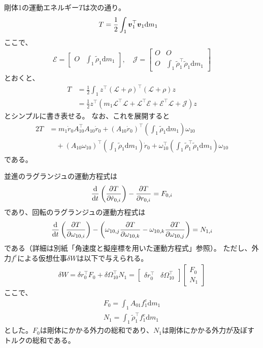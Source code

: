 \documentclass[a4j,10pt]{jsarticle}
\def\vctr#1{\mbox{\boldmath $#1$}}
\newcommand{\bbn}[2]{\dfrac{{\rm {\rm d}} #1}{{\rm {\rm d}} #2}}
\newcommand{\henbbn}[2]{\dfrac{\partial #1}{\partial #2}}
\newcommand{\zenbbn}[1]{\mathrm{d} #1}
\begin{document}
剛体1の運動エネルギー$T$は次の通り。
\begin{align}
    T &= \frac{1}{2}\int_1 \vctr{v}_1^\top \vctr{v}_1 \zenbbn{m_1}
\end{align}
ここで、
\begin{align*}
    \mathcal{E} = \begin{bmatrix}
        O & \int_1 \tilde{\rho}_1 \zenbbn{m_1}
    \end{bmatrix},
    \quad
    \mathcal{J} = \begin{bmatrix}
        O & O\\
        O & \int_1 \tilde{\rho}_1^\top \tilde{\rho}_1\zenbbn{m_1}
    \end{bmatrix}
\end{align*}
とおくと、
\begin{align}
    T &=\frac{1}{2}\int_1 z^\top (\mathcal{L} + \mathcal{\rho})^\top(\mathcal{L}+\mathcal{\rho})z\nonumber\\
    &= \frac{1}{2}z^\top\left( m_1 \mathcal{L}^\top \mathcal{L} + \mathcal{L}^\top \mathcal{E} + \mathcal{E}^\top \mathcal{L} + \mathcal{J} \right)z
\end{align}
とシンプルに書き表せる。
なお、これを展開すると
\begin{align*}
    2T &= m_1\dot{r}_0A_{10}^\top A_{10}\dot{r}_0
    + (A_{10}\dot{r}_0)^\top \left(\int_1 \tilde{\rho}_1 \zenbbn{m_1}\right)\omega_{10}\\
    &\quad+ (A_{10}\omega_{10})^\top \left(\int_1 \tilde{\rho}_1 \zenbbn{m_1}\right)\dot{r}_0
    + \omega_{10}^\top \left(\int_1 \tilde{\rho}_1^\top \tilde{\rho}_1\zenbbn{m_1}\right) \omega_{10}
\end{align*}
である。

並進のラグランジュの運動方程式は
\begin{align}
    \bbn{}{t}\left( \henbbn{T}{\dot{r}_{0,i}} \right) - \henbbn{T}{r_{0,i}} = F_{0,i}
\end{align}
であり、回転のラグランジュの運動方程式は
\begin{align}
    \bbn{}{t}\left( \henbbn{T}{\omega_{10,i}} \right) - \left( \omega_{10,j}\henbbn{T}{\omega_{10,k}} - \omega_{10,k}\henbbn{T}{\omega_{10,j}} \right) = N_{1,i}
\end{align}
である（詳細は別紙「角速度と擬座標を用いた運動方程式」参照）。
ただし、外力$f^{e}$による仮想仕事$\delta W$は以下で与えられる。
\begin{align}
    \delta W = \delta r_0^\top F_0 + \delta \Omega_{10}^\top N_1
    =\begin{bmatrix}
        \delta r_0^\top & \delta \Omega_{10}^\top
    \end{bmatrix}\begin{bmatrix}
        F_0\\
        N_1
    \end{bmatrix}
\end{align}
ここで、
\begin{align*}
    F_0 = \int_1 A_{01}f_1^{e}\zenbbn{m_1}\\
    N_1 = \int_1 \tilde{\rho}_1^\top f_1^{e}\zenbbn{m_1}
\end{align*}
とした。$F_0$は剛体にかかる外力の総和であり、$N_1$は剛体にかかる外力が及ぼすトルクの総和である。
\end{document}
